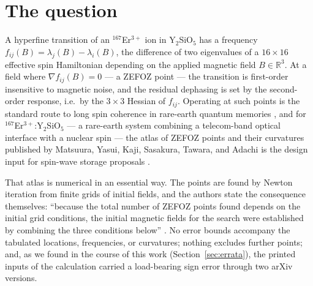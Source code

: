 \documentclass[11pt]{amsart}
\theoremstyle{plain}
\theoremstyle{definition}
\theoremstyle{remark}
\begin{document}
\begin{abstract}
curvature brackets for the ten published zero-field pairs.  To the second
question the answer is a documented negative: a pre-registered kill condition
for the completeness search fired.  Certified branch-and-bound exclusion over
the box $\|B\|_\infty\le100$~mT, measured on stratified sample chunks, gives a
strict lower bound above $10^{6}$ laptop-hours against a pre-registered budget
of $200$; the
obstruction --- quasi-degenerate hyperfine doublets that force per-level
spectral-gap machinery below its validity radius --- is quantified.  Three
errata in the reference paper are recorded, with version history: a
load-bearing sign error in a printed quadrupole matrix that stood for eleven
months (v1, v2; corrected upstream in v3), two tabulated frequencies
inconsistent with their own stationary points by $2.7$ and $4.3$~MHz
(certified restatements given), and an inconsistent sign pairing in a printed
field vector.  The certificate and a standard-library checker are the public
unit.
\end{abstract}

\maketitle

\section{The question}\label{sec:question}

A hyperfine transition of an $^{167}$Er$^{3+}$ ion in Y$_2$SiO$_5$ has a
frequency $f_{ij}(B)=\lambda_j(B)-\lambda_i(B)$, the difference of two
eigenvalues of a $16\times16$ effective spin Hamiltonian depending on the
applied magnetic field $B\in\mathbb R^3$.  At a field where $\nabla
f_{ij}(B)=0$ --- a ZEFOZ point \cite{Fraval2004} --- the transition is
first-order insensitive to magnetic noise, and the residual dephasing is set by
the second-order response, i.e.\ by the $3\times3$ Hessian of $f_{ij}$.
Operating at such points is the standard route to long spin coherence in
rare-earth quantum memories \cite{Zhong2015,Ortu2601}, and for
$^{167}$Er$^{3+}$:Y$_2$SiO$_5$ --- a rare-earth system combining a
telecom-band optical interface with a nuclear spin --- the atlas of ZEFOZ
points and their curvatures published by Matsuura, Yasui, Kaji, Sasakura,
Tawara, and Adachi \cite{Matsuura} is the design input for spin-wave storage
proposals \cite{Matsuura,Business2606}.

That atlas is numerical in an essential way.  The points are found by Newton
iteration from finite grids of initial fields, and the authors state the
consequence themselves: ``because the total number of ZEFOZ points found
depends on the initial grid conditions, the initial magnetic fields for the
search were established by combining the three conditions below''
\cite[App.~D]{Matsuura}.  No error bounds accompany the tabulated locations,
frequencies, or curvatures; nothing excludes further points; and, as we found
in the course of this work (Section~\ref{sec:errata}), the printed inputs of
the calculation carried a load-bearing sign error through two arXiv versions.
\end{document}
